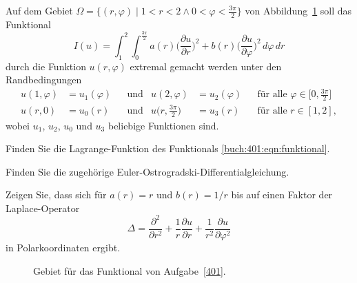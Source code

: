 Auf dem Gebiet
$\Omega = \{ (r,\varphi) \mid 1<r<2\wedge 0<\varphi<\frac{3\pi}{2} \}$
von Abbildung~\ref{buch:401:fig:domain} soll das Funktional
\begin{equation}
I(u)
=
\int_1^2 \int_0^\frac{3\pi}2
a(r)
\biggl(\frac{\partial u}{\partial r}\biggr)^2
+
b(r)
\biggl(\frac{\partial u}{\partial \varphi}\biggr)^2
\,d\varphi\,dr
\label{buch:401:eqn:funktional}
\end{equation}
durch die Funktion $u(r,\varphi)$ extremal gemacht werden unter den
Randbedingungen 
\begin{equation}
\begin{aligned}
u(1,\varphi)&=u_1(\varphi)&&\text{und}&
u(2,\varphi)&=u_2(\varphi)&&\text{für alle }\varphi\in\biggl[0,\frac{3\pi}2\biggr]
\\
u(r,0)&=u_0(r)&&\text{und}&
u\biggl(r,\frac{3\pi}2\biggr)&=u_3(r)&&\text{für alle }r\in[1,2],
\end{aligned}
\label{buch:401:eqn:rb}
\end{equation}
wobei $u_1$, $u_2$, $u_0$ und $u_3$ beliebige Funktionen sind.
\begin{teilaufgaben}
\item
Finden Sie die Lagrange-Funktion des Funktionals
\eqref{buch:401:eqn:funktional}.
\item
Finden Sie die zugehörige Euler-Ostrogradski-Differentialgleichung.
\item
Zeigen Sie, dass sich für $a(r)=r$ und $b(r)=1/r$ bis auf einen
Faktor der Laplace-Operator
\[
\Delta
=
\frac{\partial^2}{\partial r^2}
+
\frac{1}{r}\frac{\partial u}{\partial r}
+
\frac{1}{r^2}\frac{\partial u}{\partial\varphi^2}
\]
in Polarkoordinaten ergibt.
\end{teilaufgaben}
\begin{figure}
\centering
\def\r{3}
\def\w{55}
\def\wmax{135}
\caption{Gebiet für das Funktional von Aufgabe~\ref{401}.
\label{buch:401:fig:domain}}
\end{figure}

